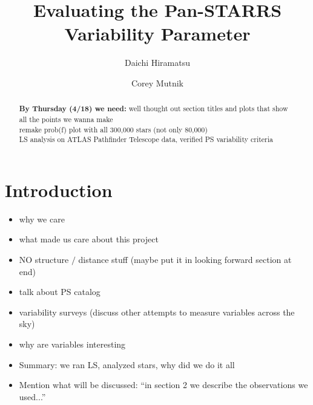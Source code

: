\documentclass[aps,prb,twocolumn,superscriptaddress]{revtex4-1}
\begin{document}
\title{Evaluating the Pan-STARRS Variability Parameter}


%


\author{Daichi Hiramatsu}
\author{Corey Mutnik}



\begin{abstract}
\textbf{By Thursday (4/18) we need:} well thought out section titles and plots that show all the points we wanna make\\

remake prob(f) plot with all 300,000 stars (not only 80,000)\\

LS analysis on ATLAS Pathfinder Telescope data, verified PS variability criteria
\end{abstract}

\maketitle    




\section{Introduction}


\begin{itemize}
	\item{} why we care
	\item{} what made us care about this project
	\item{} NO structure $/$ distance stuff (maybe put it in looking forward section at end)
	\item{} talk about PS catalog
	\item{} variability surveys (discuss other attempts to measure variables across the sky)
	\item{} why are variables interesting
	\item{} Summary: we ran LS, analyzed stars, why did we do it all
	\item{} Mention what will be discussed: ``in section 2 we describe the observations we used...''
\end{itemize}
\end{document}
